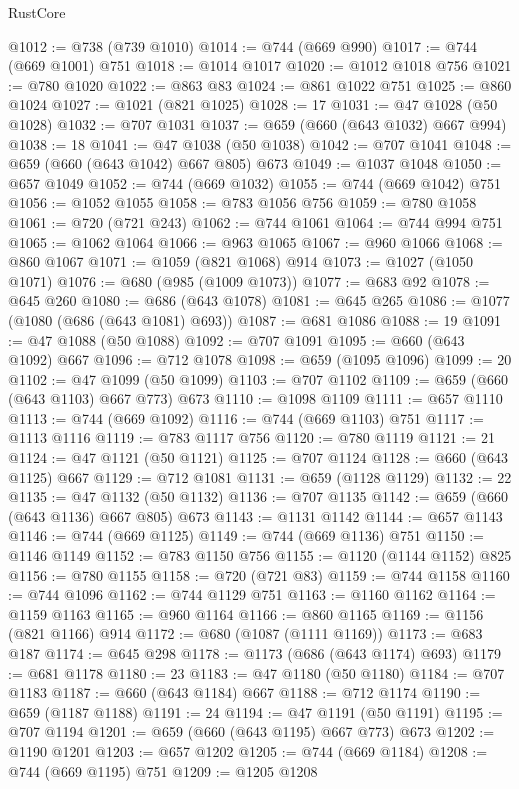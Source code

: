\begin{lexlean}{RustCore}
\begin{coremodule}
@1012 := @738 (@739 @1010)
@1014 := @744 (@669 @990)
@1017 := @744 (@669 @1001) @751
@1018 := @1014 @1017
@1020 := @1012 @1018 @756
@1021 := @780 @1020
@1022 := @863 @83
@1024 := @861 @1022 @751
@1025 := @860 @1024
@1027 := @1021 (@821 @1025)
@1028 := 17
@1031 := @47 @1028 (@50 @1028)
@1032 := @707 @1031
@1037 := @659 (@660 (@643 @1032) @667 @994)
@1038 := 18
@1041 := @47 @1038 (@50 @1038)
@1042 := @707 @1041
@1048 := @659 (@660 (@643 @1042) @667 @805) @673
@1049 := @1037 @1048
@1050 := @657 @1049
@1052 := @744 (@669 @1032)
@1055 := @744 (@669 @1042) @751
@1056 := @1052 @1055
@1058 := @783 @1056 @756
@1059 := @780 @1058
@1061 := @720 (@721 @243)
@1062 := @744 @1061
@1064 := @744 @994 @751
@1065 := @1062 @1064
@1066 := @963 @1065
@1067 := @960 @1066
@1068 := @860 @1067
@1071 := @1059 (@821 @1068) @914
@1073 := @1027 (@1050 @1071)
@1076 := @680 (@985 (@1009 @1073))
@1077 := @683 @92
@1078 := @645 @260
@1080 := @686 (@643 @1078)
@1081 := @645 @265
@1086 := @1077 (@1080 (@686 (@643 @1081) @693))
@1087 := @681 @1086
@1088 := 19
@1091 := @47 @1088 (@50 @1088)
@1092 := @707 @1091
@1095 := @660 (@643 @1092) @667
@1096 := @712 @1078
@1098 := @659 (@1095 @1096)
@1099 := 20
@1102 := @47 @1099 (@50 @1099)
@1103 := @707 @1102
@1109 := @659 (@660 (@643 @1103) @667 @773) @673
@1110 := @1098 @1109
@1111 := @657 @1110
@1113 := @744 (@669 @1092)
@1116 := @744 (@669 @1103) @751
@1117 := @1113 @1116
@1119 := @783 @1117 @756
@1120 := @780 @1119
@1121 := 21
@1124 := @47 @1121 (@50 @1121)
@1125 := @707 @1124
@1128 := @660 (@643 @1125) @667
@1129 := @712 @1081
@1131 := @659 (@1128 @1129)
@1132 := 22
@1135 := @47 @1132 (@50 @1132)
@1136 := @707 @1135
@1142 := @659 (@660 (@643 @1136) @667 @805) @673
@1143 := @1131 @1142
@1144 := @657 @1143
@1146 := @744 (@669 @1125)
@1149 := @744 (@669 @1136) @751
@1150 := @1146 @1149
@1152 := @783 @1150 @756
@1155 := @1120 (@1144 @1152) @825
@1156 := @780 @1155
@1158 := @720 (@721 @83)
@1159 := @744 @1158
@1160 := @744 @1096
@1162 := @744 @1129 @751
@1163 := @1160 @1162
@1164 := @1159 @1163
@1165 := @960 @1164
@1166 := @860 @1165
@1169 := @1156 (@821 @1166) @914
@1172 := @680 (@1087 (@1111 @1169))
@1173 := @683 @187
@1174 := @645 @298
@1178 := @1173 (@686 (@643 @1174) @693)
@1179 := @681 @1178
@1180 := 23
@1183 := @47 @1180 (@50 @1180)
@1184 := @707 @1183
@1187 := @660 (@643 @1184) @667
@1188 := @712 @1174
@1190 := @659 (@1187 @1188)
@1191 := 24
@1194 := @47 @1191 (@50 @1191)
@1195 := @707 @1194
@1201 := @659 (@660 (@643 @1195) @667 @773) @673
@1202 := @1190 @1201
@1203 := @657 @1202
@1205 := @744 (@669 @1184)
@1208 := @744 (@669 @1195) @751
@1209 := @1205 @1208

\end{coremodule}
\end{lexlean}
